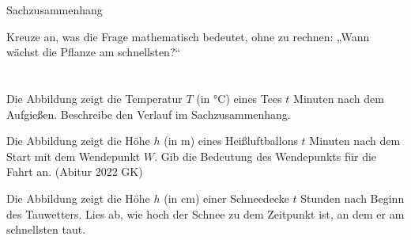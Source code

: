 \setcounter{aufgabe}{33}

\begin{aufgabe}{Sachzusammenhang}
\begin{teile}
\teil Kreuze an, was die Frage mathematisch bedeutet, ohne zu rechnen: „Wann wächst die Pflanze am schnellsten?“ \\  \\  \\ 
\teil Die Abbildung zeigt die Temperatur $T$ (in °C) eines Tees $t$ Minuten nach dem Aufgießen. Beschreibe den Verlauf im Sachzusammenhang.

\begin{ksys}[xmin=0,xmax=40,ymin=0,ymax=100,xstep=10,ystep=20,xlabel=t in min,ylabel=T in °C,ablesen]  \end{ksys}
\teil Die Abbildung zeigt die Höhe $h$ (in m) eines Heißluftballons $t$ Minuten nach dem Start mit dem Wendepunkt $W$. Gib die Bedeutung des Wendepunkts für die Fahrt an. \hfill (Abitur 2022 GK)

\begin{ksys}[xmin=0,xmax=20,ymin=0,ymax=90,xstep=5,ystep=10,xlabel=t in min,ylabel=h in m,ablesen]   \end{ksys}
\teil Die Abbildung zeigt die Höhe $h$ (in cm) einer Schneedecke $t$ Stunden nach Beginn des Tauwetters. Lies ab, wie hoch der Schnee zu dem Zeitpunkt ist, an dem er am schnellsten taut.


\end{teile}
\end{aufgabe}
